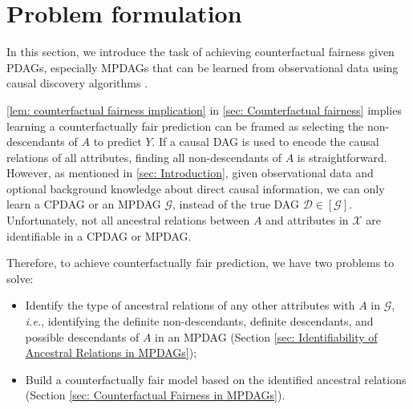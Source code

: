 \documentclass{article}
\begin{document}
\section{Problem formulation}\label{sec: Problem Formulation}
In this section, we introduce the task of achieving counterfactual fairness given PDAGs, especially MPDAGs that can be learned from observational data using causal discovery algorithms \citep{spirtes1991algorithm,colombo2014order,chickering2002learning}. 

\cref{lem: counterfactual fairness implication} in \cref{sec: Counterfactual fairness} implies learning a counterfactually fair prediction can be framed as selecting the non-descendants of $A$ to predict $Y$. If a causal DAG is used to encode the causal relations of all attributes, finding all non-descendants of $A$ is straightforward. However, as mentioned in \cref{sec: Introduction}, given observational data and optional background knowledge about direct causal information, we can only learn a CPDAG or an MPDAG $\mathcal{G}$, instead of the true DAG $\mathcal{D} \in [\mathcal{G}]$. Unfortunately, not all ancestral relations between $A$ and attributes in $\mathcal{X}$ are identifiable in a CPDAG or MPDAG. 


Therefore, to achieve counterfactually fair prediction, we have two problems to solve:
\begin{itemize}
\itemsep0em
    \item Identify the type of ancestral relations of any other attributes with $A$ in $\mathcal{G}$, {\it i.e.}, identifying the definite non-descendants, definite descendants, and possible descendants of $A$ in an MPDAG (Section \ref{sec: Identifiability of Ancestral Relations in MPDAGs});
    \item Build a counterfactually fair model based on the identified ancestral relations (Section \ref{sec: Counterfactual Fairness in MPDAGs}).
\end{itemize}
\end{document}
